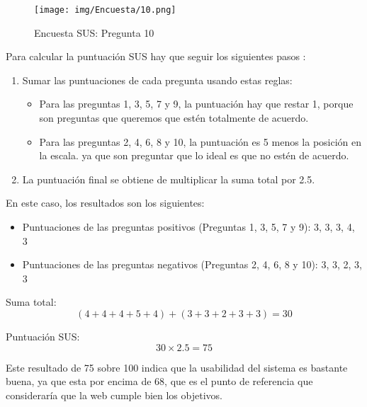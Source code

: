 \begin{figure}[h]
\centering
\texttt{[image: img/Encuesta/10.png]}
\caption{Encuesta SUS: Pregunta 10}
\label{fig:10}
\end{figure}

Para calcular la puntuación SUS hay que seguir los siguientes pasos \cite{SUS}:


\begin{enumerate}
\item Sumar las puntuaciones de cada pregunta  usando estas reglas:
\begin{itemize}
\item Para las preguntas 1, 3, 5, 7 y 9, la puntuación hay que restar 1, porque son preguntas que queremos que estén totalmente de acuerdo.
\item Para las preguntas 2, 4, 6, 8 y 10, la puntuación es 5 menos la posición en la escala. ya que son preguntar que lo ideal es que no estén de acuerdo.
\end{itemize}
\item La puntuación final se obtiene de multiplicar la suma total por 2.5.
\end{enumerate}

En este caso, los resultados son los siguientes:

\begin{itemize}
    \item Puntuaciones de las preguntas positivos (Preguntas 1, 3, 5, 7 y 9): 3, 3, 3, 4, 3
    \item Puntuaciones de las preguntas negativos (Preguntas 2, 4, 6, 8 y 10): 3, 3, 2, 3, 3
\end{itemize}

Suma total:
\[
(4+4+4+5+4) + (3+3+2+3+3) = 30
\]

Puntuación SUS:
\[
30 \times 2.5 = 75
\]

Este resultado de 75 sobre 100 indica que la usabilidad del sistema es bastante buena, ya que esta por encima de 68, que es el punto de referencia que consideraría que la web cumple bien los objetivos.
